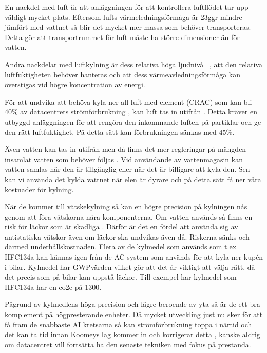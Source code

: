\documentclass[conference,a4paper]{IEEEtran}
\begin{document}
En nackdel med luft är att \cite{modelling2} anläggningen för att kontrollera luftflödet tar upp väldigt mycket plats. \cite{thermalconduct} Eftersom lufts värmeledningsförmåga 
är 23ggr mindre jämfört med vattnet så blir det mycket mer massa som behöver transporteras. Detta gör att transportrummet för luft måste ha större dimensioner än för vatten.

Andra nackdelar med luftkylning är dess relativa höga ljudnivå ~\cite{immersioncooling1}, att den relativa luftfuktigheten behöver hanteras och att dess värmeavledningsförmåga
kan överstigas vid högre koncentration av energi.

För att undvika att behöva kyla ner all luft med element (CRAC) \cite{energy3} som kan bli 40\% av datacentrets strömförbrukning \cite{heatexchange1}, kan luft 
tas in utifrån \cite{free-cooling2}. Detta kräver en utbyggd anläggningen för att rengöra den inkommande luften på partiklar och ge den rätt luftfuktighet. 
På detta sätt kan förbrukningen sänkas med 45\%.

Även vatten kan tas in utifrån men då finns det mer regleringar på mängden insamlat vatten som behöver följas \cite{liqcool2}. Vid användande av vattenmagasin kan vatten 
samlas när den är tillgänglig eller när det är billigare att kyla den. Sen kan vi använda det kylda vattnet när elen är dyrare och på detta sätt
få ner våra kostnader för kylning.

När de kommer till vätskekylning så kan en högre precision på kylningen nås \cite{energycompare2} genom att föra vätskorna nära komponenterna. Om vatten används så finns en risk  
för läckor som är skadliga \cite{liqcool1}. Därför är det en fördel att använda sig av antistatiska vätskor även om läckor ska undvikas även då. Riskerna sänks och därmed 
underhållskostnaden. Flera av de kylmedel som används som t.ex HFC134a kan kännas igen från de AC system som används för att kyla ner kupén i bilar. 
\cite{GWP} Kylmedel har GWPvärden vilket gör att det är viktigt att välja rätt, då det precis som på bilar kan uppstå läckor. Till exempel har 
kylmedel som HFC134a har en co2e på 1300.    

Pågrund av kylmedlens höga precision och lägre beroende av yta så är de ett bra komplement på högpresterande enheter. Då mycket utveckling just nu sker för att 
få fram de snabbaste AI kretsarna så kan strömförbrukning toppa i närtid och det kan ta tid innan Koomeys lag kommer in och 
korrigerar detta \cite{Koomey}, kanske aldrig om datacentret vill fortsätta ha den senaste tekniken med fokus på prestanda. 
\end{document}
